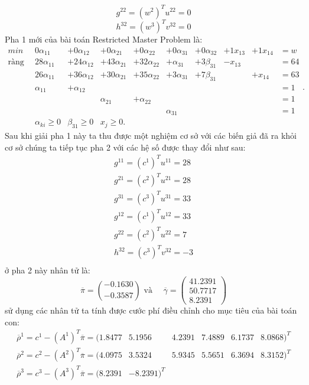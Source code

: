 \begin{displaymath}g^{22}=(w^2)^Tu^{22}=0\end{displaymath}
\begin{displaymath}h^{32}=(w^3)^Tv^{32}=0\end{displaymath}
Pha 1 mới của bài toán Restricted Master Problem là:
\begin{equation}\label{PT1017}
\begin{array}{lllllllllll}
min&0\alpha_{11}&+0\alpha_{12}&+0\alpha_{21}&+0\alpha_{22}&+0\alpha_{31}&+0\alpha_{32}&+1x_{13}&+1x_{14}&=w\\
\textrm{ràng buộc}&28\alpha_{11}&+24\alpha_{12}&+43\alpha_{21}&+32\alpha_{22}&+\alpha_{31}&+3\beta_{31}&-x_{13}&&=64\\
&26\alpha_{11}&+36\alpha_{12}&+30\alpha_{21}&+35\alpha_{22}&+3\alpha_{31}&+7\beta_{31}&&+x_{14}&=63\\
&\alpha_{11}&+\alpha_{12}&&&&&&&=1\\
&&&\alpha_{21}&+\alpha_{22}&&&&&=1\\
&&&&&\alpha_{31}&&&&=1\\
&\alpha_{ki}\geq0&\beta_{31}\geq0& x_j\geq0.
\end{array}.
\end{equation}
Sau khi giải pha 1 này ta thu được một nghiệm cơ sở với các biến giả đã ra khỏi cơ sở chúng ta tiếp tục pha 2 với các hệ số được thay đổi như sau:
\begin{displaymath}
\begin{array}{ll}
g^{11}=(c^1)^Tu^{11}=28\\
g^{21}=(c^2)^Tu^{21}=28\\
g^{31}=(c^3)^Tu^{31}=33\\
g^{12}=(c^1)^Tu^{12}=33\\
g^{22}=(c^2)^Tu^{22}=7\\
h^{32}=(c^3)^Tv^{32}=-3\\
\end{array}
\end{displaymath}
ở pha 2 này nhân tử là:
\begin{displaymath}\overline\pi=\binom{-0.1630}{-0.3587}\textrm{ và }\quad \overline\gamma=\left(\begin{matrix}41.2391\\50.7717\\8.2391\end{matrix}\right)\end{displaymath}
sử dụng các nhân tử ta tính được cước phí điều chỉnh cho mục tiêu của bài toán con:
\begin{displaymath}
\begin{array}{llllll}
\overline\rho^1=c^1-(A^1)^T\overline\pi=(1.8477&5.1956&4.2391&7.4889&6.1737&8.0868)^T\\
\overline\rho^2=c^2-(A^2)^T\overline\pi=(4.0975&3.5324&5.9345&5.5651&6.3694&8.3152)^T\\
\overline\rho^3=c^3-(A^3)^T\overline\pi=(8.2391&-8.2391)^T\\
\end{array}
\end{displaymath}
